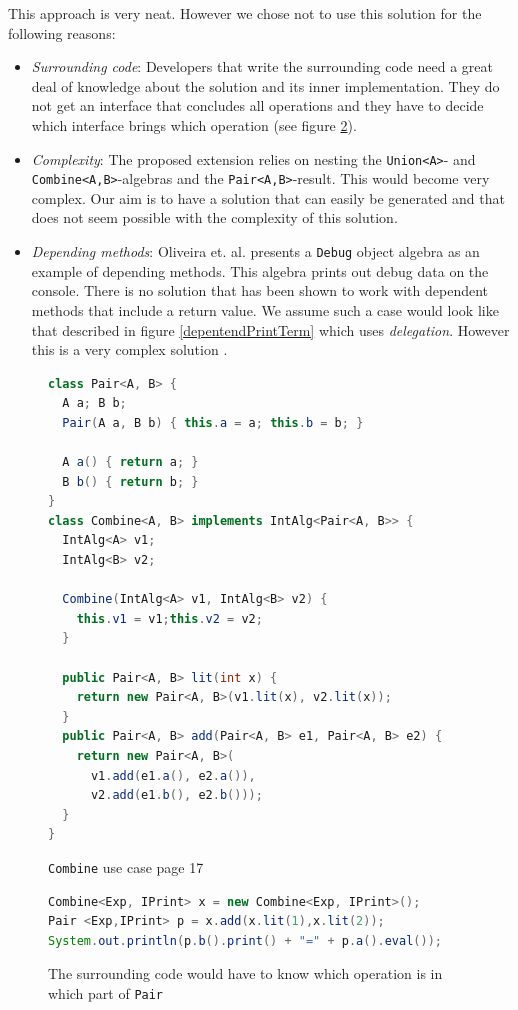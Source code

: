 \documentclass{report}
\begin{document}
This approach is very neat. However we chose not to use this solution for the following reasons:

\begin{itemize}
  \item \emph{Surrounding code}: Developers that write the surrounding code need a great deal of knowledge about the solution and its inner implementation. They do not get an interface that concludes all operations and they have to decide which interface brings which operation (see figure \ref{combineExampleSurrounding}).
  \item \emph{Complexity}: The proposed extension relies on nesting the \lstinline{Union<A>}- and \lstinline{Combine<A,B>}-algebras and the \lstinline{Pair<A,B>}-result. This would become very complex. Our aim is to have a solution that can easily be generated and that does not seem possible with the complexity of this solution.
  \item \emph{Depending methods}: Oliveira et. al. presents a \lstinline{Debug} object algebra as an example of depending methods. This algebra prints out debug data on the console. There is no solution that has been shown to work with dependent methods that include a return value. We assume such a case would look like that described in figure \ref{depentendPrintTerm} which uses \emph{delegation}. However this is a very complex solution \cite{Tempero-Multiple-2000}.
\end{itemize}

\begin{figure}[H]
\begin{lstlisting}[language=java]
class Pair<A, B> {
  A a; B b;
  Pair(A a, B b) { this.a = a; this.b = b; }

  A a() { return a; }
  B b() { return b; }
}
class Combine<A, B> implements IntAlg<Pair<A, B>> {
  IntAlg<A> v1;
  IntAlg<B> v2;

  Combine(IntAlg<A> v1, IntAlg<B> v2) {
    this.v1 = v1;this.v2 = v2;
  }
  
  public Pair<A, B> lit(int x) {
    return new Pair<A, B>(v1.lit(x), v2.lit(x));
  }
  public Pair<A, B> add(Pair<A, B> e1, Pair<A, B> e2) {
    return new Pair<A, B>(
      v1.add(e1.a(), e2.a()),
      v2.add(e1.b(), e2.b()));
  }
}
\end{lstlisting}
\caption{\lstinline{Combine} use case \cite{Oliv-Extensibility-2012} page 17}
\label{combineExampleOliv}
\end{figure}

\begin{figure}[H]
\begin{lstlisting}[language=java]
Combine<Exp, IPrint> x = new Combine<Exp, IPrint>();
Pair <Exp,IPrint> p = x.add(x.lit(1),x.lit(2));
System.out.println(p.b().print() + "=" + p.a().eval());
\end{lstlisting}
\caption{The surrounding code would have to know which operation is in which part of \lstinline{Pair}}
\label{combineExampleSurrounding}
\end{figure}
\end{document}
